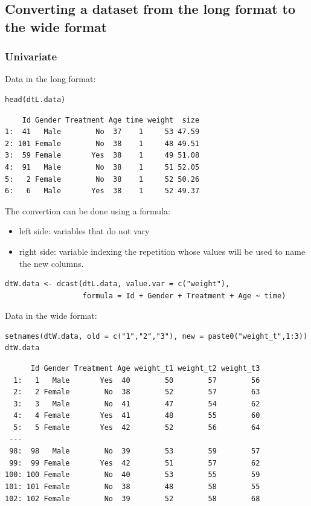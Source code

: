 \documentclass{article}
\begin{document}
\subsection{Converting a dataset from the long format to the wide format}
\label{sec:orga70fb7c}

\subsubsection{Univariate}
\label{sec:org34e3cb8}
Data in the long format:
\lstset{language=r,label= ,caption= ,captionpos=b,numbers=none}
\begin{lstlisting}
head(dtL.data)
\end{lstlisting}

\begin{verbatim}
    Id Gender Treatment Age time weight  size
1:  41   Male        No  37    1     53 47.59
2: 101 Female        No  38    1     48 49.51
3:  59 Female       Yes  38    1     49 51.08
4:  91   Male        No  38    1     51 52.05
5:   2 Female        No  38    1     52 50.26
6:   6   Male       Yes  38    1     52 49.37
\end{verbatim}

The convertion can be done using a formula:
\begin{itemize}
\item left side: variables that do not vary
\item right side: variable indexing the repetition whose values will be
used to name the new columns.
\end{itemize}
\lstset{language=r,label= ,caption= ,captionpos=b,numbers=none}
\begin{lstlisting}
dtW.data <- dcast(dtL.data, value.var = c("weight"),
				  formula = Id + Gender + Treatment + Age ~ time)
\end{lstlisting}

Data in the wide format:
\lstset{language=r,label= ,caption= ,captionpos=b,numbers=none}
\begin{lstlisting}
setnames(dtW.data, old = c("1","2","3"), new = paste0("weight_t",1:3))
dtW.data
\end{lstlisting}

\begin{verbatim}
      Id Gender Treatment Age weight_t1 weight_t2 weight_t3
  1:   1   Male       Yes  40        50        57        56
  2:   2 Female        No  38        52        57        63
  3:   3   Male        No  41        47        54        62
  4:   4 Female       Yes  41        48        55        60
  5:   5 Female       Yes  42        52        56        64
 ---                                                       
 98:  98   Male        No  39        53        59        57
 99:  99 Female       Yes  42        51        57        62
100: 100 Female        No  40        53        55        59
101: 101 Female        No  38        48        58        55
102: 102 Female        No  39        52        58        68
\end{verbatim}
\end{document}
